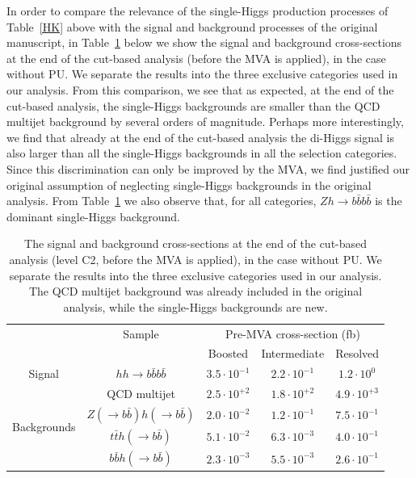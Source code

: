\documentclass[11pt,a4paper]{article}
\begin{document}
\begin{itemize}
  In order to compare the relevance of the single-Higgs production processes of Table~\ref{HK} above
  with the signal and background processes of the original manuscript, in
  Table~\ref{HBxsec} below we show the signal and background cross-sections at the end of the cut-based analysis
  (before the MVA is applied), in the case without PU.
  We separate the results into the three exclusive categories used in our analysis.
  From this comparison, we see that as expected, at the end of the cut-based analysis, the single-Higgs
  backgrounds are smaller than the QCD multijet background by several orders of magnitude.
  Perhaps more interestingly, we find that already at the end of the cut-based analysis the di-Higgs
  signal is also larger than all the single-Higgs backgrounds in all the selection categories.
  Since this discrimination can only be improved by the MVA, we find justified our original
  assumption of neglecting single-Higgs backgrounds in the original analysis.
%
  From Table~\ref{HBxsec} we also observe that, for all categories, $Zh\to b\bar{b}b\bar{b}$ is
  the dominant single-Higgs background.
  
  \begin{table}[h]
\begin{center}
\begin{tabular}{|c|c|c|c|c|}
\hline
& Sample &  \multicolumn{3}{c|}{Pre-MVA cross-section (fb)}\\
 & &  Boosted  & Intermediate & Resolved \\
\hline\hline
Signal & $hh\to b\bar{b}b\bar{b}$ & $3.5\cdot 10^{-1}$  & $2.2\cdot 10^{-1}$ &  $1.2\cdot 10^{0}$ \\
\hline
\multirow{4}{*}{Backgrounds} & QCD multijet &  $2.5\cdot 10^{+2}$ & $1.8\cdot 10^{+2}$ & $4.9\cdot 10^{+3}$ \\
&$Z(\to b\bar{b})h(\to b\bar{b})$ & $2.0\cdot 10^{-2}$ & $1.2\cdot 10^{-1}$ & $7.5\cdot 10^{-1}$ \\
&$t\bar{t}h(\to b\bar{b})$ & $5.1\cdot 10^{-2}$ & $6.3\cdot 10^{-3}$ & $4.0\cdot 10^{-1}$ \\
&$b\bar{b}h(\to b\bar{b})$ & $2.3\cdot 10^{-3}$ & $5.5\cdot 10^{-3}$ & $2.6\cdot 10^{-1}$\\
\hline
\end{tabular}
\end{center}
\caption{\small \label{HBxsec} The signal and background cross-sections at the end of the cut-based analysis
  (level C2, before the MVA is applied), in the case without PU.
  We separate the results into the three exclusive categories used in our analysis.
  The QCD multijet background was already included in the original analysis,
  while the single-Higgs backgrounds are new.
}
  \end{table}%


\end{itemize}
\end{document}
